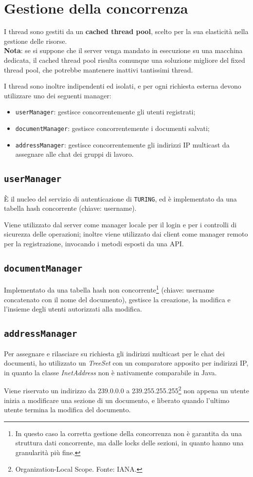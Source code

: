 \section{Gestione della concorrenza}
I thread sono gestiti da un \textbf{cached thread pool}, scelto per la sua elasticità nella gestione delle risorse.\\
\textbf{Nota}: se si suppone che il server venga mandato in esecuzione su una macchina dedicata, il cached thread pool risulta comunque una soluzione migliore del fixed thread pool, che potrebbe mantenere inattivi tantissimi thread.

\medskip

I thread sono inoltre indipendenti ed isolati, e per ogni richiesta esterna devono utilizzare uno dei seguenti manager:

\begin{itemize}
	\item \texttt{userManager}: gestisce concorrentemente gli utenti registrati;
	\item \texttt{documentManager}: gestisce concorrentemente i documenti salvati;
	\item \texttt{addressManager}: gestisce concorrentemente gli indirizzi IP multicast da assegnare alle chat dei gruppi di lavoro.
\end{itemize}

\subsection{\texttt{userManager}}
È il nucleo del servizio di autenticazione di \texttt{TURING}, ed è implementato da una tabella hash concorrente (chiave: username).

Viene utilizzato dal server come manager locale per il login e per i controlli di sicurezza delle operazioni; inoltre viene utilizzato dai client come manager remoto per la registrazione, invocando i metodi esposti da una API.

\subsection{\texttt{documentManager}}
Implementato da una tabella hash non concorrente\footnote{In questo caso la corretta gestione della concorrenza non è garantita da una struttura dati concorrente, ma dalle locks delle sezioni, in quanto hanno una granularità più fine.} (chiave: username concatenato con il nome del documento), gestisce la creazione, la modifica e l'insieme degli utenti autorizzati alla modifica.

\subsection{\texttt{addressManager}}
Per assegnare e rilasciare su richiesta gli indirizzi multicast per le chat dei documenti, ho utilizzato un \textit{TreeSet} con un comparatore apposito per indirizzi IP, in quanto la classe \textit{InetAddress} non è nativamente comparabile in Java.

Viene riservato un indirizzo da 239.0.0.0 a 239.255.255.255\footnote{Organization-Local Scope. Fonte: IANA.} non appena un utente inizia a modificare una sezione di un documento, e liberato quando l'ultimo utente termina la modifica del documento.

